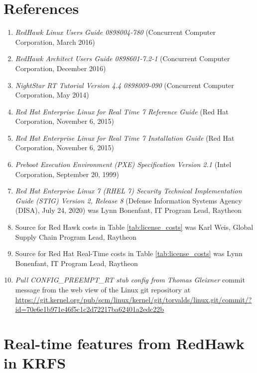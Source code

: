 \documentclass[12pt]{article}
\begin{document}
%
\newpage
\section{References}

\begin{enumerate}
    \item \textit{RedHawk Linux Users Guide 0898004-780} (Concurrent Computer
Corporation, March 2016) \label{ref:red_hawk_guide}
    \item \textit{RedHawk Architect Users Guide 0898601-7.2-1} (Concurrent
Computer Corporation, December 2016) \label{ref:architect}
    \item \textit{NightStar RT Tutorial Version 4.4 0898009-090} (Concurrent
Computer Corporation, May 2014) \label{ref:nightstar}
    \item \textit{Red Hat Enterprise Linux for Real Time 7 Reference Guide} (Red
Hat Corporation, November 6, 2015) \label{ref:rhel7_ref}
    \item \textit{Red Hat Enterprise Linux for Real Time 7 Installation Guide}
(Red Hat Corporation, November 6, 2015) \label{ref:rhel7_install}
    \item \textit{Preboot Execution Environment (PXE) Specification Version 2.1}
(Intel Corporation, September 20, 1999) \label{ref:pxe_boot}
    \item \textit{Red Hat Enterprise Linux 7 (RHEL 7) Security Technical
Implementation Guide (STIG) Version 2, Release 8} (Defense Information Systems
Agency (DISA), July 24, 2020) \label{ref:stig}
was Lynn Bonenfant, IT Program Lead, Raytheon \label{ref:lynn}
    \item Source for Red Hawk costs in Table \ref{tab:license_costs} was Karl
Weis, Global Supply Chain Program Lead, Raytheon \label{ref:karl}
    \item Source for Red Hat Real-Time costs in Table \ref{tab:license_costs}
was Lynn Bonenfant, IT Program Lead, Raytheon \label{ref:lynn}
    \item \textit{Pull CONFIG\_PREEMPT\_RT stub config from Thomas Gleixner}
commit message from the web view of the Linux git repository at
\url{https://git.kernel.org/pub/scm/linux/kernel/git/torvalds/linux.git/commit/?id=70e6e1b971e46f5c1c2d72217ba62401a2edc22b}
\label{ref:commit}
\end{enumerate}


%
\newpage
\section{Real-time features from RedHawk in KRFS}
\label{sec:redhawk_features}
\end{document}
